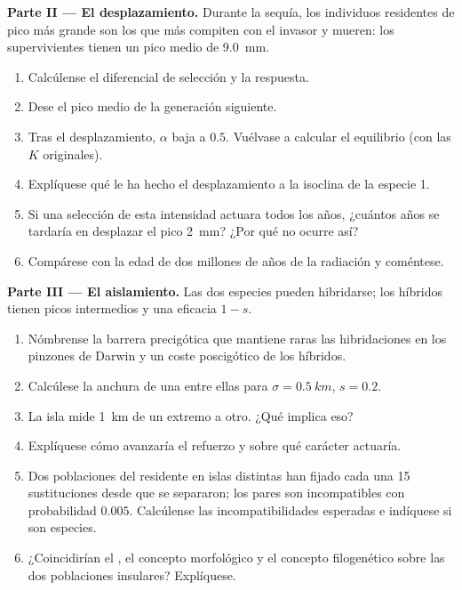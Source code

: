 \begin{problem}
\medskip
\noindent\textbf{Parte II --- El desplazamiento.}
Durante la sequía, los individuos residentes de pico más grande son los
que más compiten con el invasor y mueren: los supervivientes tienen un
pico medio de \qty{9.0}{mm}.
\begin{enumerate}[resume]
  \item Calcúlense el diferencial de selección y la respuesta.
  \item Dese el pico medio de la generación siguiente.
  \item Tras el desplazamiento, $\alpha$ baja a $0.5$. Vuélvase a calcular
        el equilibrio (con las $K$ originales).
  \item Explíquese qué le ha hecho el desplazamiento a la isoclina de la
        especie 1.
  \item Si una selección de esta intensidad actuara todos los años,
        ¿cuántos años se tardaría en desplazar el pico \qty{2}{mm}? ¿Por
        qué no ocurre así?
  \item Compárese con la edad de dos millones de años de la radiación y
        coméntese.
\end{enumerate}

\medskip
\noindent\textbf{Parte III --- El aislamiento.}
Las dos especies pueden hibridarse; los híbridos tienen picos intermedios
y una eficacia $1 - s$.
\begin{enumerate}[resume]
  \item Nómbrense la barrera precigótica que mantiene raras las
        hibridaciones en los pinzones de Darwin y un coste poscigótico de
        los híbridos.
  \item Calcúlese la anchura de una  entre ellas para $\sigma
        = \qty{0.5}{km}$, $s = 0.2$.
  \item La isla mide \qty{1}{km} de un extremo a otro. ¿Qué implica eso?
  \item Explíquese cómo avanzaría el refuerzo y sobre qué carácter
        actuaría.
  \item Dos poblaciones del residente en islas distintas han fijado cada
        una 15 sustituciones desde que se separaron; los pares son
        incompatibles con probabilidad $0.005$. Calcúlense las
        incompatibilidades esperadas e indíquese si son especies.
  \item ¿Coincidirían el , el concepto
        morfológico y el concepto filogenético sobre las dos poblaciones
        insulares? Explíquese.
\end{enumerate}


\end{problem}

